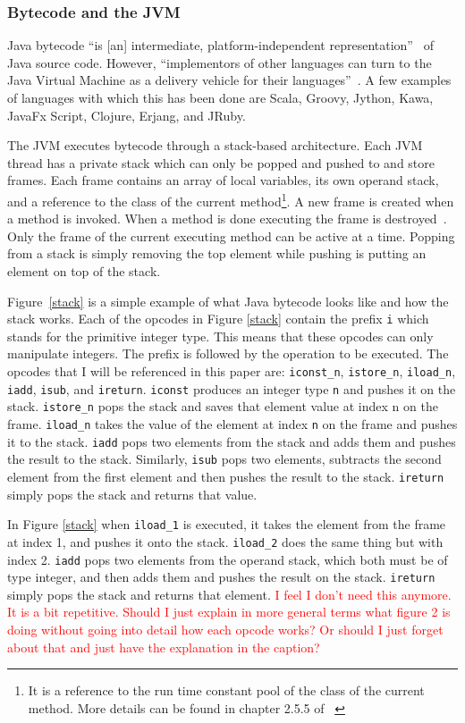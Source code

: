 \documentclass{sig-alternate}
\newcommand{\mycomment}[1]{\textcolor{red}{#1}}
\begin{document}
\subsubsection{ Bytecode and the JVM}
Java bytecode ``is [an] intermediate, platform-independent representation''~\cite{FINCH2:2009} of Java source code. However, ``implementors of other languages can turn to the Java Virtual Machine as a delivery vehicle for their languages''~\cite{JVMspec:2013}. A few examples of languages with which this has been done are Scala, Groovy, Jython, Kawa, JavaFx Script, Clojure, Erjang, and JRuby.

The JVM executes bytecode through a stack-based architecture. Each JVM thread has a private stack which can only be popped and pushed to and store frames. Each frame contains an array of local variables, its own operand stack, and a reference to the class of the current method\footnote{It is a reference to the run time constant pool of the class of the current method. More details can be found in chapter 2.5.5 of ~\cite{JVMspec:2013}}. A new frame is created when a method is invoked. When a method is done executing the frame is destroyed~\cite{Oracle:2013}. Only the frame of the current executing method can be active at a time. Popping from a stack is simply removing the top element while pushing is putting an element on top of the stack.

Figure~\ref{stack} is a simple example of what Java bytecode looks like and how the stack works. Each of the opcodes in Figure \ref{stack} contain the prefix \texttt{i} which stands for the primitive integer type. This means that these opcodes can only manipulate integers. The prefix is followed by the operation to be executed. The opcodes that I will be referenced in this paper are: \texttt{iconst\_n}, \texttt{istore\_n}, \texttt{iload\_n}, \texttt{iadd}, \texttt{isub}, and \texttt{ireturn}. \texttt{iconst} produces an integer type \texttt{n} and pushes it on the stack. \texttt{istore\_n} pops the stack and saves that element value at index n on the frame. \texttt{iload\_n} takes the value of the element at index \texttt{n} on the frame and pushes it to the stack. \texttt{iadd} pops two elements from the stack and adds them and pushes the result to the stack. Similarly, \texttt{isub} pops two elements, subtracts the second element from the first element and then pushes the result to the stack. \texttt{ireturn} simply pops the stack and returns that value.

In Figure \ref{stack} when \texttt{iload\_1} is executed, it takes the element from the frame at index 1, and pushes it onto the stack. \texttt{iload\_2} does the same thing but with index 2. \texttt{iadd} pops two elements from the operand stack, which both must be of type integer, and then adds them and pushes the result on the stack. \texttt{ireturn} simply pops the stack and returns that element. \mycomment{I feel I don't need this anymore. It is a bit repetitive. Should I just explain in more general terms what figure 2 is doing without going into detail how each opcode works? Or should I just forget about that and just have the explanation in the caption?}
\end{document}
